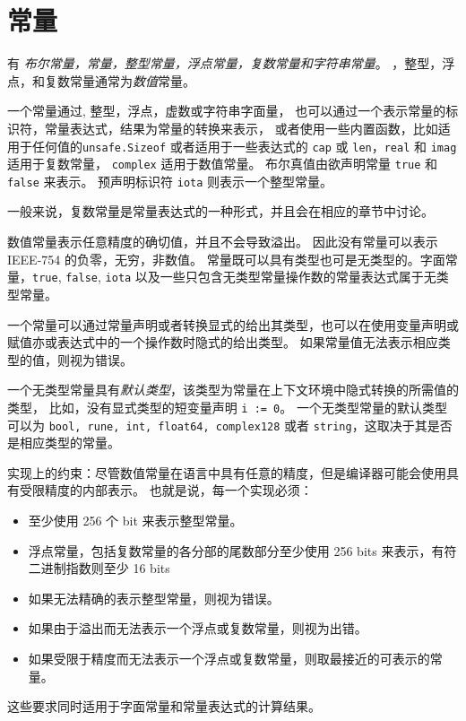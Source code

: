 
\chapter{常量}
有 \emph{布尔常量，\rune{}常量，整型常量，浮点常量，复数常量和字符串常量}。
\rune{}，整型，浮点，和复数常量通常为\emph{数值}常量。

一个常量通过\rune{}, 整型，浮点，虚数或字符串字面量，
也可以通过一个表示常量的标识符，常量表达式，结果为常量的转换来表示，
或者使用一些内置函数，比如适用于任何值的\lstinline|unsafe.Sizeof| 或者适用于一些表达式的 \lstinline|cap| 或 \lstinline|len|，\lstinline|real| 和 \lstinline|imag| 适用于复数常量，
\lstinline|complex| 适用于数值常量。
布尔真值由欲声明常量 \lstinline|true| 和 \lstinline|false| 来表示。
预声明标识符 \lstinline|iota| 则表示一个整型常量。

一般来说，复数常量是常量表达式的一种形式，并且会在相应的章节中讨论。

数值常量表示任意精度的确切值，并且不会导致溢出。
因此没有常量可以表示 IEEE-754 的负零，无穷，非数值。
常量既可以具有类型也可是无类型的。字面常量，\lstinline|true|, \lstinline|false|, \lstinline|iota| 以及一些只包含无类型常量操作数的常量表达式属于无类型常量。

一个常量可以通过常量声明或者转换显式的给出其类型，也可以在使用变量声明或赋值亦或表达式中的一个操作数时隐式的给出类型。
如果常量值无法表示相应类型的值，则视为错误。

一个无类型常量具有\emph{默认类型}，该类型为常量在上下文环境中隐式转换的所需值的类型，
比如，没有显式类型的短变量声明 \lstinline|i := 0|。
一个无类型常量的默认类型可以为 \lstinline|bool, rune, int, float64, complex128| 或者 \lstinline|string|，这取决于其是否是相应类型的常量。

实现上的约束：尽管数值常量在语言中具有任意的精度，但是编译器可能会使用具有受限精度的内部表示。
也就是说，每一个实现必须：
\begin{itemize}
\item 至少使用 256 个 bit 来表示整型常量。
\item 浮点常量，包括复数常量的各分部的尾数部分至少使用 256 bits 来表示，有符二进制指数则至少 16 bits
\item 如果无法精确的表示整型常量，则视为错误。
\item 如果由于溢出而无法表示一个浮点或复数常量，则视为出错。
\item 如果受限于精度而无法表示一个浮点或复数常量，则取最接近的可表示的常量。
\end{itemize}
这些要求同时适用于字面常量和常量表达式的计算结果。